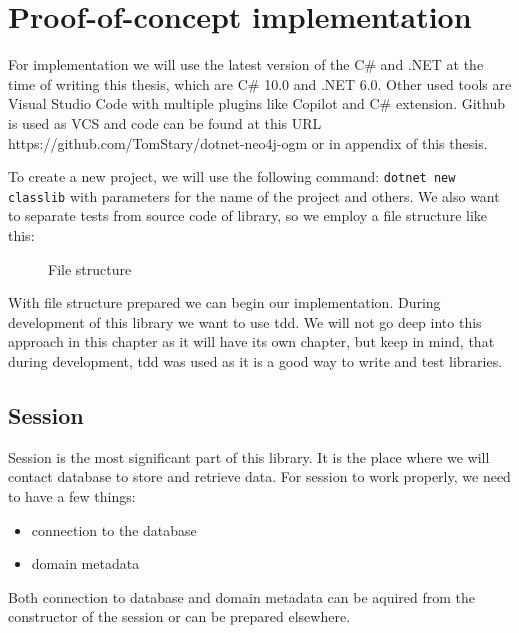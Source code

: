\chapter {Proof-of-concept implementation}

For implementation we will use the latest version of the C\# and .NET at the time of writing this thesis, which are C\# 10.0 and .NET 6.0.
Other used tools are Visual Studio Code with multiple plugins like Copilot and C\# extension. Github is used as VCS and code can be
found at this URL https://github.com/TomStary/dotnet-neo4j-ogm or in appendix of this thesis.

To create a new project, we will use the following command: \texttt{dotnet new classlib} with parameters for the name of the project and others.
We also want to separate tests from source code of library, so we employ a file structure like this:

\begin{figure}[H]
    \caption{File structure}
\end{figure}

With file structure prepared we can begin our implementation. During development of this
library we want to use \acrfull{tdd}. We will not go deep into this approach in this chapter
as it will have its own chapter, but keep in mind, that during development, \acrshort{tdd} was used as it is a good way to write and test libraries.

\section {Session}

Session is the most significant part of this library. It is the place where we will contact database to store and retrieve data.
For session to work properly, we need to have a few things:

\begin{itemize}
    \item connection to the database
    \item domain metadata
\end{itemize}

Both connection to database and domain metadata can be aquired from the constructor of the session or can be prepared elsewhere.

